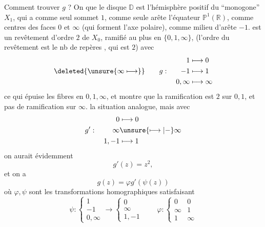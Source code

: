 Comment trouver $g$ ? On  que le disque $\mathbb D$ est l'hémisphère positif du  ``monogone''  $X_1$, qui  a comme seul sommet $1$, comme seule arête l'équateur $\mathbb P^1(\mathbb R)$, comme centres des  faces $0$ et $\infty$ (qui forment l'axe polaire), comme milieu d'arête $-1$.
 est un revêtement d'ordre $2$ de $X_0$, ramifié  au plus en $\{0,1,\infty\}$, (l'ordre du revêtement est le nb de repères , qui est $2$) avec
\[
\deleted{\unsure{\infty\longmapsto}}\qquad
g:\quad\begin{aligned}
1&\longmapsto0\\
-1&\longmapsto1\\
0,\infty&\longmapsto\infty
\end{aligned}
\]
ce qui épuise les fibres en $0,1,\infty$, et montre que la ramification est $2$ sur $0,1$, et pas de ramification sur $\infty$.   la  situation analogue,  mais avec
\[
g':\quad\begin{aligned}
0&\longmapsto0\\
\infty&\unsure{\longmapsto|\mathbin{-}}\infty\\
1,-1&\longmapsto1
\end{aligned}
\]
on aurait évidemment
\[
g'(z)=z^2,
\]
et on a
\[
g(z)=\varphi g'(\psi(z))
\]
où $\varphi,\psi$ sont les transformations homographiques satisfaisant
\[
\psi:\left\{\begin{array}{c}1\\-1\\0,\infty\end{array}\right.
\longrightarrow
\left\{\begin{array}{c}0\\\infty\\1,-1\end{array}\right.
\qquad
\varphi:\left\{\begin{array}{cc}0&0\\\infty&1\\1&\infty\end{array}\right.
\]
